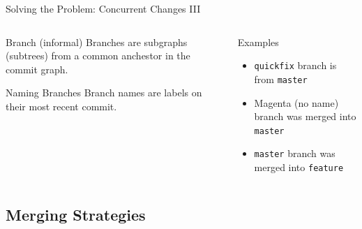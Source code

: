 \documentclass[xetex, handout]{beamer}
\begin{document}
\begin{frame}[fragile]{Solving the Problem: Concurrent Changes III}
  \begin{columns}[t]
    \begin{column}{.5\linewidth}
      \begin{block}{Branch (informal)}
        Branches are subgraphs (subtrees) from a common anchestor in the commit
        graph.
      \end{block}
      \begin{alertblock}{Naming Branches}
        Branch names are labels on their most recent commit.
      \end{alertblock}
    \end{column}
    \begin{column}{.5\linewidth}
      \begin{exampleblock}{Examples}
        \begin{itemize}
          \item \texttt{quickfix} branch is from \texttt{master}
          \item Magenta (no name) branch was merged into \texttt{master}
          \item \texttt{master} branch was merged into \texttt{feature}
        \end{itemize}
      \end{exampleblock}
    \end{column}
  \end{columns}
\end{frame}

\subsection{Merging Strategies}
\end{document}
